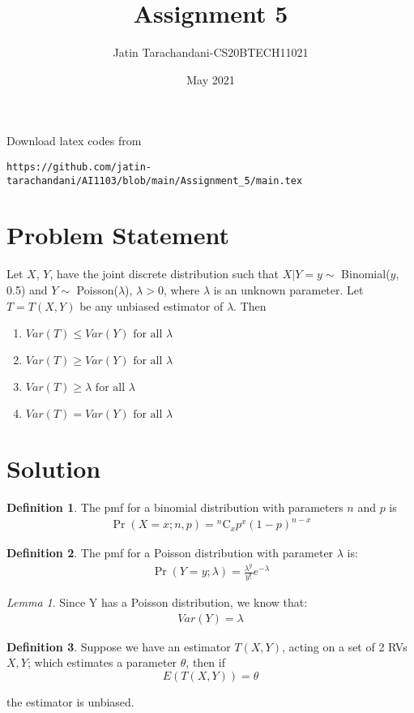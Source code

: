 \documentclass[twocolumn]{article}
\title{Assignment 5}
\author{Jatin Tarachandani-CS20BTECH11021}
\date{May 2021}
\newcommand{\comb}[2]{{}^{#1}\mathrm{C}_{#2}}
\providecommand{\pr}[1]{\ensuremath{\Pr\left(#1\right)}}
\providecommand{\brak}[1]{\ensuremath{\left(#1\right)}}
\theoremstyle{remark}
\newtheorem{lemma}[theorem]{Lemma}
\theoremstyle{definition}
\newtheorem{definition}{Definition}[section]
\numberwithin{equation}{subsection}
\begin{document}
\maketitle
Download latex codes from 
%
\begin{lstlisting}
https://github.com/jatin-tarachandani/AI1103/blob/main/Assignment_5/main.tex
\end{lstlisting}
\section{Problem Statement}
Let $X$, $Y$, have the joint discrete distribution such that $X|Y=y \sim$ Binomial($y$, 0.5) and $Y\sim$ Poisson($\lambda$), $\lambda>0$, where $\lambda$ is an unknown parameter. Let $T=T(X, Y)$ be any unbiased estimator of $\lambda$. Then
\begin{enumerate}
    \item  $Var(T) \leq Var(Y)  \text{ for all } \lambda$
    \item $Var(T) \geq Var(Y) \text{ for all } \lambda$
    \item $Var(T) \geq \lambda \text{ for all } \lambda$
    \item $Var(T) = Var(Y) \text{ for all } \lambda$
\end{enumerate}

\section{Solution}
\begin{definition}
The pmf for a binomial distribution with parameters $n$ and $p$ is
\begin{align}
    \pr{X=x;n, p}=\comb{n}{x}p^{x}\brak{1-p}^{n-x}
\end{align}
\end{definition}
\begin{definition}
The pmf for a Poisson distribution with parameter $\lambda$ is:
\begin{align}
    \pr{Y=y; \lambda}=\frac{\lambda^y}{y!} e^{-\lambda}
\end{align}
\end{definition}
\begin{lemma}
Since Y has a Poisson distribution, we know that:
\begin{align}\label{Var=lam}
Var(Y)=\lambda
\end{align}
\end{lemma}
\begin{definition}
Suppose we have an estimator $T(X, Y)$, acting on a set of 2 RVs $X, Y$; which estimates a parameter $\theta$, then if
\begin{equation}
    E\brak{T(X, Y)}=\theta
\end{equation}

the estimator is unbiased. 
\end{definition}
\end{document}
